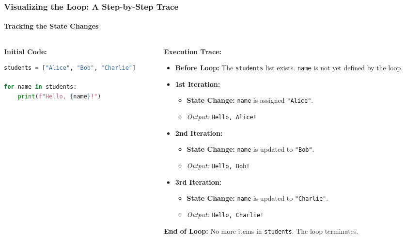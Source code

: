 \documentclass{beamer}
\begin{document}
\begin{frame}[fragile]
    \frametitle{Visualizing the Loop: A Step-by-Step Trace}
    \framesubtitle{Tracking the State Changes}

    \begin{columns}[T]
        \begin{column}{0.4\textwidth}
            \textbf{Initial Code:}
            \begin{lstlisting}[language=Python, basicstyle=\small\ttfamily]
students = ["Alice", "Bob", "Charlie"]

for name in students:
    print(f"Hello, {name}!")
            \end{lstlisting}
        \end{column}
        \begin{column}{0.6\textwidth}
            \textbf{Execution Trace:}
            \begin{itemize}
                \item \textbf{Before Loop:} The \texttt{students} list exists. \texttt{name} is not yet defined by the loop.
                \pause
                \item \textbf{1st Iteration:}
                \begin{itemize}
                    \item \textbf{State Change:} \texttt{name} is assigned \texttt{"Alice"}.
                    \item \textit{Output:} \texttt{Hello, Alice!}
                \end{itemize}
                \pause
                \item \textbf{2nd Iteration:}
                \begin{itemize}
                    \item \textbf{State Change:} \texttt{name} is updated to \texttt{"Bob"}.
                    \item \textit{Output:} \texttt{Hello, Bob!}
                \end{itemize}
                \pause
                \item \textbf{3rd Iteration:}
                \begin{itemize}
                    \item \textbf{State Change:} \texttt{name} is updated to \texttt{"Charlie"}.
                    \item \textit{Output:} \texttt{Hello, Charlie!}
                \end{itemize}
            \end{itemize}
            \pause
            \textbf{End of Loop:} No more items in \texttt{students}. The loop terminates.
        \end{column}
    \end{columns}


\end{frame}
\end{document}

